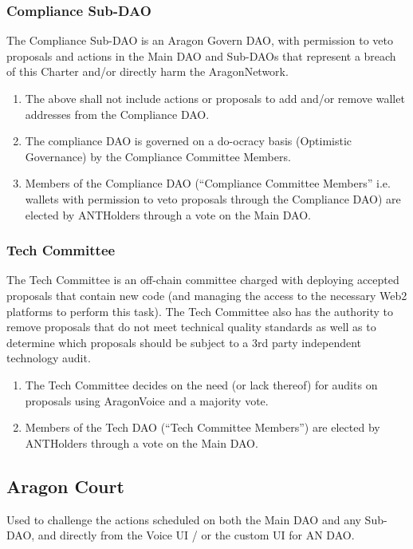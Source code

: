 \subsubsection*{Compliance Sub-\ac{DAO}}

The Compliance Sub-\ac{DAO} is an Aragon Govern \ac{DAO}, with permission to veto proposals and actions in the Main \ac{DAO} and Sub-\acp{DAO} that represent a breach of this Charter and/or directly harm the \gls{AragonNetwork}.
\begin{enumerate}
	\item The above shall not include actions or proposals to add and/or remove wallet addresses from the Compliance \ac{DAO}.
	\item The compliance \ac{DAO} is governed on a do-ocracy basis (Optimistic Governance) by the Compliance Committee Members.
	\item Members of the Compliance \ac{DAO} (``Compliance Committee Members'' i.e. wallets with permission to veto proposals through the Compliance \ac{DAO}) are elected by \glspl{ANTHolder} through a vote on the Main \ac{DAO}.
\end{enumerate}


\subsubsection*{Tech Committee}

The Tech Committee is an off-chain committee charged with deploying accepted proposals that contain new code (and managing the access to the necessary Web2 platforms to perform this task).
The Tech Committee also has the authority to remove proposals that do not meet technical quality standards as well as to determine which proposals should be subject to a 3rd party independent technology audit.
\begin{enumerate}
	\item The Tech Committee decides on the need (or lack thereof) for audits on proposals using \gls{AragonVoice} and a majority vote.
	\item Members of the Tech \ac{DAO} (``Tech Committee Members'') are elected by \glspl{ANTHolder} through a vote on the Main \ac{DAO}.
\end{enumerate}

\subsection{Aragon Court}
Used to challenge the actions scheduled on both the Main \ac{DAO} and any Sub-\ac{DAO}, and directly from the Voice UI / or the custom UI for AN \ac{DAO}.
	


